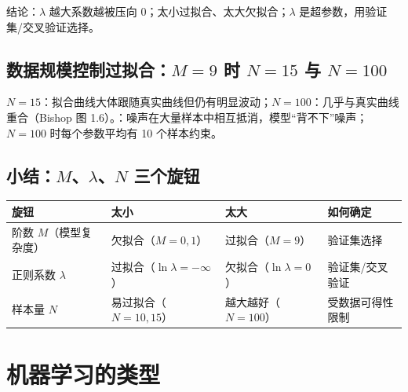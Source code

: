 \smallskip
\noindent 结论：$\lambda$ 越大系数越被压向 0；太小过拟合、太大欠拟合；$\lambda$ 是超参数，用验证集/交叉验证选择。

\subsection{数据规模控制过拟合：\texorpdfstring{$M=9$}{M=9} 时 \texorpdfstring{$N=15$}{N=15} 与 \texorpdfstring{$N=100$}{N=100}}
$N=15$：拟合曲线大体跟随真实曲线但仍有明显波动；$N=100$：几乎与真实曲线重合（Bishop 图 1.6）。：噪声在大量样本中相互抵消，模型“背不下”噪声；$N=100$ 时每个参数平均有 10 个样本约束。

\subsection{小结：\texorpdfstring{$M$、$\lambda$、$N$}{M, lambda, N} 三个旋钮}
\begin{center}\small\renewcommand{\arraystretch}{1.1}
\begin{tabularx}{\linewidth}{@{}p{3.2cm}LLp{3.2cm}@{}}
\toprule
旋钮 & 太小 & 太大 & 如何确定 \\
\midrule
阶数 $M$（模型复杂度） & 欠拟合（$M=0,1$） & 过拟合（$M=9$） & 验证集选择 \\
正则系数 $\lambda$ & 过拟合（$\ln\lambda=-\infty$） & 欠拟合（$\ln\lambda=0$） & 验证集/交叉验证 \\
样本量 $N$ & 易过拟合（$N=10,15$） & 越大越好（$N=100$） & 受数据可得性限制 \\
\bottomrule
\end{tabularx}
\end{center}

\section{机器学习的类型}

